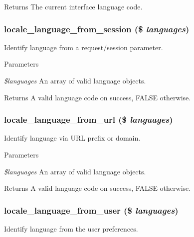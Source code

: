 \begin{DoxyReturn}{Returns}
The current interface language code. 
\end{DoxyReturn}
\hypertarget{group__locale_ga4a15e35684fc4fe7a9486b5beee06f1b}{
\subsubsection[{locale\_\-language\_\-from\_\-session}]{\setlength{\rightskip}{0pt plus 5cm}locale\_\-language\_\-from\_\-session (\$ {\em languages})}}
\label{group__locale_ga4a15e35684fc4fe7a9486b5beee06f1b}
Identify language from a request/session parameter.


\begin{DoxyParams}{Parameters}
\item[{\em \$languages}]An array of valid language objects.\end{DoxyParams}
\begin{DoxyReturn}{Returns}
A valid language code on success, FALSE otherwise. 
\end{DoxyReturn}
\hypertarget{group__locale_gaf8f7a2acb2a80fbd8897437ab8eba1d6}{
\subsubsection[{locale\_\-language\_\-from\_\-url}]{\setlength{\rightskip}{0pt plus 5cm}locale\_\-language\_\-from\_\-url (\$ {\em languages})}}
\label{group__locale_gaf8f7a2acb2a80fbd8897437ab8eba1d6}
Identify language via URL prefix or domain.


\begin{DoxyParams}{Parameters}
\item[{\em \$languages}]An array of valid language objects.\end{DoxyParams}
\begin{DoxyReturn}{Returns}
A valid language code on success, FALSE otherwise. 
\end{DoxyReturn}
\hypertarget{group__locale_gae7cfd386cb96e33f7728374ef2e3dc42}{
\subsubsection[{locale\_\-language\_\-from\_\-user}]{\setlength{\rightskip}{0pt plus 5cm}locale\_\-language\_\-from\_\-user (\$ {\em languages})}}
\label{group__locale_gae7cfd386cb96e33f7728374ef2e3dc42}
Identify language from the user preferences.


